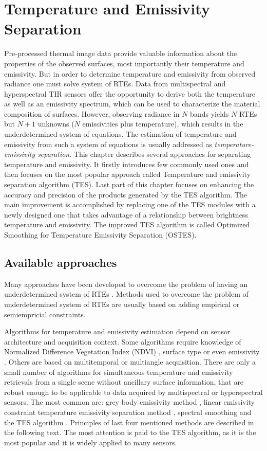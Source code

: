 \chapter{Temperature and Emissivity Separation}
\label{chap:TES}

Pre-processed thermal image data provide valuable information about the properties of the observed surfaces, most importantly their temperature and emissivity. But in order to determine temperature and emissivity from observed radiance one must solve system of RTEs. Data from multispectral and hyperspectral TIR sensors offer the opportunity to derive both the temperature as well as an emissivity spectrum, which can be used to characterize the material composition of surfaces. However, observing radiance in $N$ bands yields $N$ RTEs but $N+1$ unknowns ($N$ emissivities plus temperature), which results in the underdetermined system of equations. The estimation of temperature and emissivity from such a system of equations is usually addressed as \textit{temperature-emissivity separation}. This chapter describes several approaches for separating temperature and emissivity. It firstly introduces few commonly used ones and then focuses on the most popular approach called Temperature and emissivity separation algorithm (TES). Last part of this chapter focuses on enhancing the accuracy and precision of the products generated by the TES algorithm. The main improvement is accomplished by replacing one of the TES modules with a newly designed one that takes advantage of a relationship between brightness temperature and emissivity. The improved TES algorithm is called Optimized Smoothing for Temperature Emissivity Separation (OSTES).

\section{Available approaches}

Many approaches have been developed to overcome the problem of having an underdetermined system of RTEs \cite{LT13}. Methods used to overcome the problem of underdetermined system of RTEs are usually based on adding empirical or semiempricial constraints. 

Algorithms for temperature and emissivity estimation depend on sensor architecture and acquisition context. Some algorithms require knowledge of Normalized Difference Vegetation Index (NDVI) \cite{SR00}, surface type \cite{SW98} or even emissivity \cite{JC09}. Others are based on multitemporal \cite{W08} or multiangle \cite{SS07} acquisition. There are only a small number of algorithms for simultaneous temperature and emissivity retrievals from a single scene without ancillary surface information, that are robust enough to be applicable to data acquired by multispectral or hyperspectral sensors. The most common are: grey body emissivity method \cite{BP96}, linear emissivity constraint temperature emissivity separation method \cite{WW11}, spectral smoothing \cite{B08} and the TES algorithm \cite{GR98}. Principles of last four mentioned methods are described in the following text. The most attention is paid to the TES algorithm, as it is the most popular and it is widely applied to many sensors.

